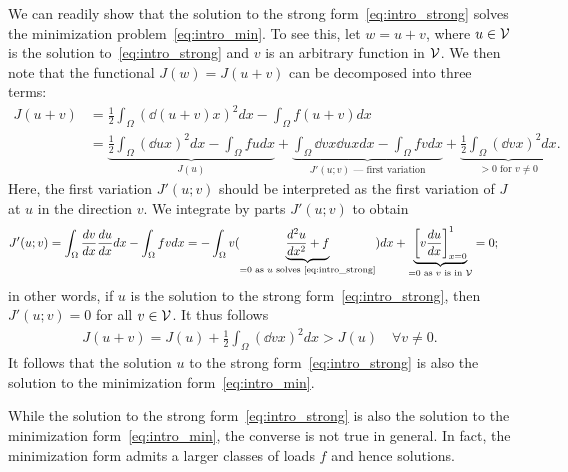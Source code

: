 We can readily show that the solution to the strong form~\eqref{eq:intro_strong} solves the minimization problem~\eqref{eq:intro_min}.  To see this, let $w = u + v$, where $u \in \mathcal{V}$ is the solution to~\eqref{eq:intro_strong} and $v$ is an arbitrary function in $\mathcal{V}$.  We then note that the functional $J(w) = J(u+v)$ can be decomposed into three terms:
\begin{align*}
  J(u+v) &= \frac{1}{2} \int_{\Omega} \left( \dd{(u+v)}{x} \right)^2 dx - \int_\Omega f(u+v) dx \\
  &= \underbrace{ \frac{1}{2} \int_{\Omega} \left( \dd{u}{x} \right)^2 dx - \int_\Omega f u dx }_{J(u)}
  + \underbrace{ \int_{\Omega} \dd{v}{x} \dd{u}{x} dx - \int_\Omega f v dx }_{J'(u;v) \text{ --- first variation}}
  + \underbrace{ \frac{1}{2} \int_{\Omega} \left( \dd{v}{x} \right)^2 dx }_{> 0 \text{ for } v \neq 0}.
\end{align*}
Here, the first variation $J'(u;v)$ should be interpreted as the first variation of $J$ at $u$ in the direction $v$.  We integrate by parts $J'(u;v)$ to obtain
\begin{align*}
  J'(u;v) &= \int_{\Omega} \frac{d v}{d x} \frac{d u}{d x} dx - \int_\Omega f v dx
  =
  - \int_{\Omega} v ( \underbrace{ \frac{d ^2u}{d x^2} + f}_{= 0 \text{ as $u$ solves \eqref{eq:intro_strong}}} ) dx + \underbrace{ \left[ v \frac{d u}{d x} \right]_{x=0}^1 }_{= 0 \text{ as $v$ is in $\mathcal{V}$}}
  = 0;
\end{align*}
in other words, if $u$ is the solution to the strong form~\eqref{eq:intro_strong}, then $J'(u;v) = 0$ for all $v \in \mathcal{V}$. It thus follows
\begin{align*}
  J(u + v) = J(u) + \frac{1}{2} \int_\Omega \left( \dd{v}{x} \right)^2 dx
  > J(u)  \quad \forall v \neq 0.
\end{align*}
It follows that the solution $u$ to the strong form~\eqref{eq:intro_strong} is also the solution to the minimization form~\eqref{eq:intro_min}.

While the solution to the strong form~\eqref{eq:intro_strong} is also the solution to the minimization form~\eqref{eq:intro_min}, the converse is not true in general.  In fact, the minimization form admits a larger classes of loads $f$ and hence solutions.

